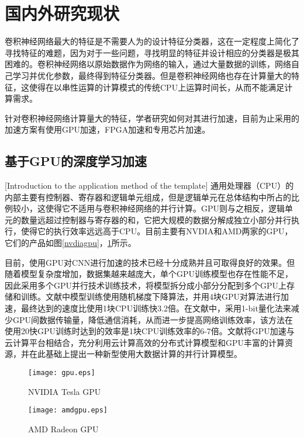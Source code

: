 \section{国内外研究现状}
卷积神经网络最大的特征是不需要人为的设计特征分类器，这在一定程度上简化了寻找特征的难题，因为对于一些问题，寻找明显的特征并设计相应的分类器是极其困难的。卷积神经网络以原始数据作为网络的输入，通过大量数据的训练，网络自己学习并优化参数，最终得到特征分类器。但是卷积神经网络也存在计算量大的特征，这使得在以串性运算的计算模式的传统CPU上运算时间长，从而不能满足计算需求\cite{cevher2014convex}。

针对卷积神经网络计算量大的特征，学者研究如何对其进行加速，目前为止采用的加速方案有使用GPU加速，FPGA加速\cite{huang2014}和专用芯片加速。

\subsection{基于GPU的深度学习加速}[Introduction to the application method of the template]
通用处理器（CPU）的内部主要有控制器、寄存器和逻辑单元组成，但是逻辑单元在总体结构中所占的比例较小\cite{shen2007compute}，这使得它不适用与卷积神经网络的并行计算。GPU则与之相反，逻辑单元的数量远超过控制器与寄存器的和，它把大规模的数据分解成独立小部分并行执行，使得它的执行效率远远高于CPU。目前主要有NVDIA和AMD两家的GPU，它们的产品如图\ref{nvdiagpu}，\ref{amdgpu}所示。

目前，使用GPU对CNN进行加速的技术已经十分成熟并且可取得良好的效果\cite{abdel2012applying}。但随着模型复杂度增加，数据集越来越庞大，单个GPU训练模型也存在性能不足，因此采用多个GPU并行技术训练技术，将模型拆分成小部分分配到多个GPU上存储和训练\cite{wang2017mul}。文献\cite{zhang2013asynchronous}中模型训练使用随机梯度下降算法，并用4块GPU对算法进行加速，最终达到的速度比使用1块CPU训练快3.2倍。在文献\cite{seide20141}中，采用1-bit量化法来减少GPU间数据传输量，降低通信消耗，从而进一步提高网络训练效率，该方法在使用20快GPU训练时达到的效率是1块CPU训练效率的6-7倍。文献\cite{xu2015}将GPU加速与云计算平台相结合，充分利用云计算高效的分布式计算模型和GPU丰富的计算资源，并在此基础上提出一种新型使用大数据计算的并行计算模型。

\begin{figure}[h]
\begin{minipage}{0.5\linewidth}
\centering
\texttt{[image: gpu.eps]}
\caption{NVIDIA Tesla GPU}
\label{nvdiagpu}
\end{minipage}
\begin{minipage}{0.5\linewidth}
\centering
\texttt{[image: amdgpu.eps]}
\caption{AMD Radeon GPU}
\label{amdgpu}
\end{minipage}
\end{figure}

